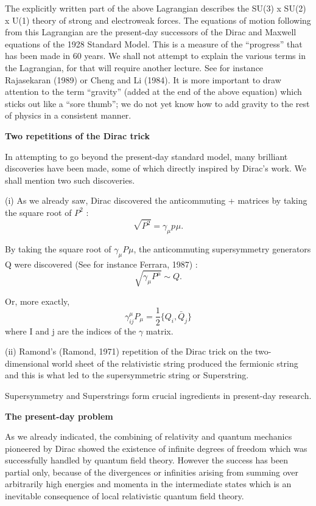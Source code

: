 The explicitly written part of the above Lagrangian describes the SU(3) x SU(2) x U(1) theory of strong and electroweak forces. The equations of motion following from this Lagrangian are the present-day successors of the Dirac and Maxwell equations of the 1928 Standard Model. This is a measure of the “progress” that has been made in 60 years. We shall not attempt to explain the various terms in the Lagrangian, for that will require another lecture. See for instance Rajasekaran (1989) or Cheng and Li (1984). It is more important to draw attention to the term “gravity” (added at the end of the above equation) which sticks out like a “sore thumb”; we do not yet know how to add gravity to the rest of physics in a consistent manner.

\textbf{Two repetitions of the Dirac trick}

In attempting to go beyond the present-day standard model, many brilliant discoveries have been made, some of which directly inspired by Dirac’s work. We shall mention two such discoveries.

(i) As we already saw, Dirac discovered the anticommuting + matrices by taking the square root of $P^{2}$ :
$$
\sqrt{P^{2}} = \gamma_{\mu}p^{}\mu.
$$

By taking the square root of  $\gamma_{\mu}P^{}\mu$, the anticommuting supersymmetry generators Q were discovered (See for instance Ferrara, 1987) :
$$
\sqrt{\gamma_{\mu} P^{\mu}}\sim Q.
$$

Or, more exactly,
$$
\gamma_{ij}^{\mu} P_{\mu} = \frac{1}{2} \{Q_{i}, \bar{Q}_{j} \}
$$
where I and j are the indices of the $\gamma$ matrix.

(ii) Ramond’s (Ramond, 1971) repetition of the Dirac trick on the two-dimensional world sheet of the relativistic string produced the fermionic string and this is what led to the supersymmetric string or Superstring.

Supersymmetry and Superstrings form crucial ingredients in present-day research.

\textbf{The present-day problem}

As we already indicated, the combining of relativity and quantum mechanics pioneered by Dirac showed the existence of infinite degrees of freedom which was successfully handled by quantum field theory. However the success has been partial only, because of the divergences or infinities arising from summing over arbitrarily high energies and momenta in the intermediate states which is an inevitable consequence of local relativistic quantum field theory.

